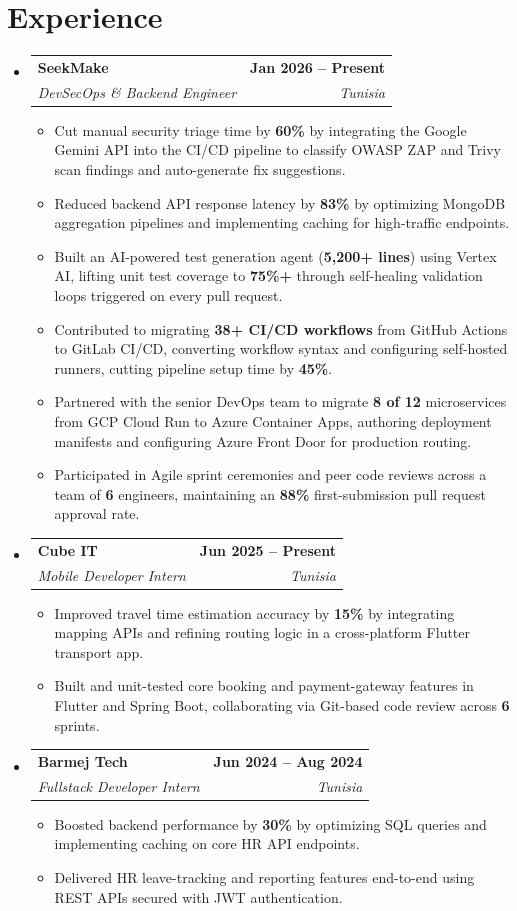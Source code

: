 \documentclass[letterpaper,11pt]{article}
\makeatletter
\newcommand{\resumeItem}[1]{\item\small{#1 \vspace{-2pt}}}
\newcommand{\resumeSubheading}[4]{
  \vspace{-2pt}\item
    \begin{tabular*}{1.0\textwidth}{l@{\extracolsep{\fill}}r}
      \textbf{\large #1} & \textbf{\small #2} \\
      \textit{\large #3} & \textit{\small #4} \\
    \end{tabular*}\vspace{-7pt}
}
\newcommand{\resumeItemListStart}{\begin{itemize}}
\newcommand{\resumeItemListEnd}{\end{itemize}\vspace{-5pt}}
\newcommand{\resumeSubHeadingListStart}{\begin{itemize}[leftmargin=0in, label={}]}
\newcommand{\resumeSubHeadingListEnd}{\end{itemize}}
\makeatother
\begin{document}
\section{Experience}
\resumeSubHeadingListStart
    \resumeSubheading
      {SeekMake}{Jan 2026 -- Present}
      {DevSecOps \& Backend Engineer}{Tunisia}
      \resumeItemListStart
        \resumeItem{Cut manual security triage time by \textbf{60\%} by integrating the Google Gemini API into the CI/CD pipeline to classify OWASP ZAP and Trivy scan findings and auto-generate fix suggestions.}
        \resumeItem{Reduced backend API response latency by \textbf{83\%} by optimizing MongoDB aggregation pipelines and implementing caching for high-traffic endpoints.}
        \resumeItem{Built an AI-powered test generation agent (\textbf{5,200+ lines}) using Vertex AI, lifting unit test coverage to \textbf{75\%+} through self-healing validation loops triggered on every pull request.}
        \resumeItem{Contributed to migrating \textbf{38+ CI/CD workflows} from GitHub Actions to GitLab CI/CD, converting workflow syntax and configuring self-hosted runners, cutting pipeline setup time by \textbf{45\%}.}
        \resumeItem{Partnered with the senior DevOps team to migrate \textbf{8 of 12} microservices from GCP Cloud Run to Azure Container Apps, authoring deployment manifests and configuring Azure Front Door for production routing.}
        \resumeItem{Participated in Agile sprint ceremonies and peer code reviews across a team of \textbf{6} engineers, maintaining an \textbf{88\%} first-submission pull request approval rate.}
      \resumeItemListEnd

    \resumeSubheading
      {Cube IT}{Jun 2025 -- Present}
      {Mobile Developer Intern}{Tunisia}
      \resumeItemListStart
        \resumeItem{Improved travel time estimation accuracy by \textbf{15\%} by integrating mapping APIs and refining routing logic in a cross-platform Flutter transport app.}
        \resumeItem{Built and unit-tested core booking and payment-gateway features in Flutter and Spring Boot, collaborating via Git-based code review across \textbf{6} sprints.}
      \resumeItemListEnd

    \resumeSubheading
      {Barmej Tech}{Jun 2024 -- Aug 2024}
      {Fullstack Developer Intern}{Tunisia}
      \resumeItemListStart
        \resumeItem{Boosted backend performance by \textbf{30\%} by optimizing SQL queries and implementing caching on core HR API endpoints.}
        \resumeItem{Delivered HR leave-tracking and reporting features end-to-end using REST APIs secured with JWT authentication.}
      \resumeItemListEnd
\resumeSubHeadingListEnd
\end{document}
